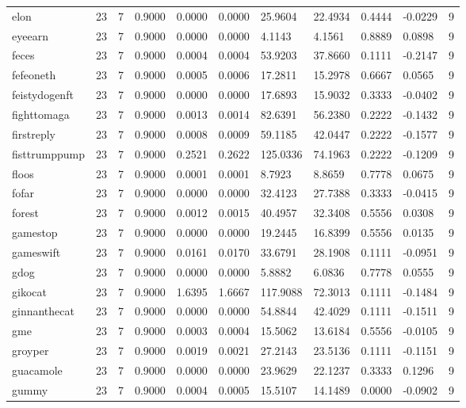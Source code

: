 \begin{table}[htbp]
\begin{tabular}{lllllllllll}
elon & 23 & 7 & 0.9000 & 0.0000 & 0.0000 & 25.9604 & 22.4934 & 0.4444 & -0.0229 & 9 \\
eyeearn & 23 & 7 & 0.9000 & 0.0000 & 0.0000 & 4.1143 & 4.1561 & 0.8889 & 0.0898 & 9 \\
feces & 23 & 7 & 0.9000 & 0.0004 & 0.0004 & 53.9203 & 37.8660 & 0.1111 & -0.2147 & 9 \\
fefeoneth & 23 & 7 & 0.9000 & 0.0005 & 0.0006 & 17.2811 & 15.2978 & 0.6667 & 0.0565 & 9 \\
feistydogenft & 23 & 7 & 0.9000 & 0.0000 & 0.0000 & 17.6893 & 15.9032 & 0.3333 & -0.0402 & 9 \\
fighttomaga & 23 & 7 & 0.9000 & 0.0013 & 0.0014 & 82.6391 & 56.2380 & 0.2222 & -0.1432 & 9 \\
firstreply & 23 & 7 & 0.9000 & 0.0008 & 0.0009 & 59.1185 & 42.0447 & 0.2222 & -0.1577 & 9 \\
fisttrumppump & 23 & 7 & 0.9000 & 0.2521 & 0.2622 & 125.0336 & 74.1963 & 0.2222 & -0.1209 & 9 \\
floos & 23 & 7 & 0.9000 & 0.0001 & 0.0001 & 8.7923 & 8.8659 & 0.7778 & 0.0675 & 9 \\
fofar & 23 & 7 & 0.9000 & 0.0000 & 0.0000 & 32.4123 & 27.7388 & 0.3333 & -0.0415 & 9 \\
forest & 23 & 7 & 0.9000 & 0.0012 & 0.0015 & 40.4957 & 32.3408 & 0.5556 & 0.0308 & 9 \\
gamestop & 23 & 7 & 0.9000 & 0.0000 & 0.0000 & 19.2445 & 16.8399 & 0.5556 & 0.0135 & 9 \\
gameswift & 23 & 7 & 0.9000 & 0.0161 & 0.0170 & 33.6791 & 28.1908 & 0.1111 & -0.0951 & 9 \\
gdog & 23 & 7 & 0.9000 & 0.0000 & 0.0000 & 5.8882 & 6.0836 & 0.7778 & 0.0555 & 9 \\
gikocat & 23 & 7 & 0.9000 & 1.6395 & 1.6667 & 117.9088 & 72.3013 & 0.1111 & -0.1484 & 9 \\
ginnanthecat & 23 & 7 & 0.9000 & 0.0000 & 0.0000 & 54.8844 & 42.4029 & 0.1111 & -0.1511 & 9 \\
gme & 23 & 7 & 0.9000 & 0.0003 & 0.0004 & 15.5062 & 13.6184 & 0.5556 & -0.0105 & 9 \\
groyper & 23 & 7 & 0.9000 & 0.0019 & 0.0021 & 27.2143 & 23.5136 & 0.1111 & -0.1151 & 9 \\
guacamole & 23 & 7 & 0.9000 & 0.0000 & 0.0000 & 23.9629 & 22.1237 & 0.3333 & 0.1296 & 9 \\
gummy & 23 & 7 & 0.9000 & 0.0004 & 0.0005 & 15.5107 & 14.1489 & 0.0000 & -0.0902 & 9 \\

\end{tabular}
\end{table}
